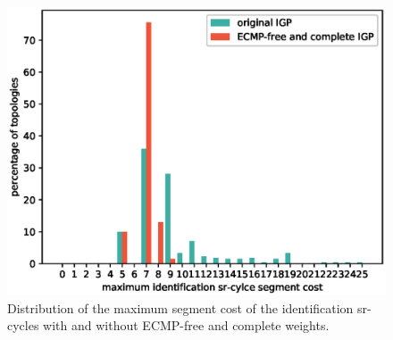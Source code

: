 \begin{figure}
\begin{center}
\includegraphics[width=.85\columnwidth]{./Network-lib/data/plot/minSegCover_identification.eps}
\end{center}
\caption{Distribution of the maximum segment cost of the identification sr-cycles with and without ECMP-free and complete weights.}
\label{fig:min-seg-cost-segcost-new}
\end{figure}
